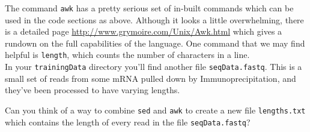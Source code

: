 \begin{advanced}
The command \texttt{awk} has a pretty serious set of in-built commands which can be used in the code sections as above.
Although it looks a little overwhelming, there is a detailed page \url{http://www.grymoire.com/Unix/Awk.html} which gives a rundown on the full capabilities of the language.
One command that we may find helpful is \texttt{length}, which counts the number of characters in a line. \\

In your \texttt{trainingData} directory you'll find another file \texttt{seqData.fastq}.
This is a small set of reads from some mRNA pulled down by Immunoprecipitation, and they've been processed to have varying lengths.

\begin{questions}
Can you think of a way to combine \texttt{sed} and \texttt{awk} to create a new file \texttt{lengths.txt} which contains the length of every read in the file \texttt{seqData.fastq}?
\end{questions}
\begin{answer}}
\texttt{sed -n `2\~{}4p' seqData.fastq | awk `\{print length(\$1)\}' > lengths.txt}
\end{answer}
\end{advanced}